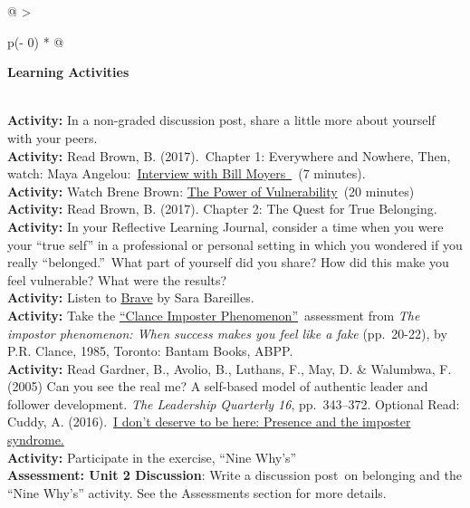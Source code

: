 \documentclass[
]{book}
\begin{document}
\begin{longtable}[]{@{}
  >{\raggedright\arraybackslash}p{(\columnwidth - 0\tabcolsep) * }@{}}
\toprule
\begin{minipage}[b]{\linewidth}\raggedright
\textbf{Learning Activities}
\end{minipage} \\
\midrule
\endhead
\textbf{Activity:} In a non-graded discussion post, share a little more about yourself with your peers. \\
\textbf{Activity:} Read Brown, B. (2017).~Chapter 1: Everywhere and Nowhere, Then, watch: Maya Angelou:~\href{http://billmoyers.com/content/conversation-maya-angelou/}{Interview with Bill Moyers~}~(7 minutes). \\
\textbf{Activity:} Watch Brene Brown: \href{https://www.ted.com/talks/brene_brown_on_vulnerability}{The Power of Vulnerability}~(20 minutes) \\
\textbf{Activity:} Read Brown, B. (2017). Chapter 2: The Quest for True Belonging. \\
\textbf{Activity:} In your Reflective Learning Journal, consider a time when you were your ``true self'' in a professional or personal setting in which you wondered if you really ``belonged.''~What part of yourself did you share? How did this make you feel vulnerable? What were the results? \\
\textbf{Activity:} Listen to \href{https://www.youtube.com/watch?v=QUQsqBqxoR4}{Brave} by Sara Bareilles. \\
\textbf{Activity:} Take the \href{https://paulineroseclance.com/pdf/IPscoringtest.pdf}{``Clance Imposter Phenomenon''}~assessment from \emph{The impostor phenomenon: When success makes you feel like a fake} (pp.~20-22), by P.R. Clance, 1985, Toronto: Bantam Books, ABPP. \\
\textbf{Activity:} Read Gardner, B., Avolio, B., Luthans, F., May, D. \& Walumbwa, F. (2005) Can you see the real me? A self-based model of authentic leader and follower development. \emph{The Leadership Quarterly 16}, pp.~343--372. Optional Read: Cuddy, A. (2016).~\href{https://leanin.org/news-inspiration/overcoming-imposter-syndrome-to-reveal-your-presence}{I don't deserve to be here: Presence and the imposter syndrome.} \\
\textbf{Activity:} Participate in the exercise, ``Nine Why's'' \\
\textbf{Assessment: Unit 2 Discussion}: Write a discussion post~on belonging and the ``Nine Why's'' activity. See the Assessments section for more details. \\
\bottomrule
\end{longtable}
\end{document}
